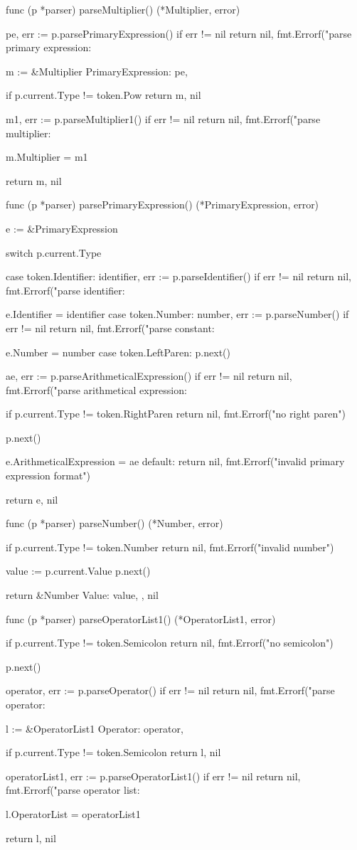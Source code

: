 func (p *parser) parseMultiplier() (*Multiplier, error) {
	pe, err := p.parsePrimaryExpression()
	if err != nil {
		return nil, fmt.Errorf("parse primary expression: %
	}

	m := &Multiplier{
		PrimaryExpression: pe,
	}

	if p.current.Type != token.Pow {
		return m, nil
	}

	m1, err := p.parseMultiplier1()
	if err != nil {
		return nil, fmt.Errorf("parse multiplier: %
	}

	m.Multiplier = m1

	return m, nil
}

func (p *parser) parsePrimaryExpression() (*PrimaryExpression, error) {
	e := &PrimaryExpression{}

	switch p.current.Type {
	case token.Identifier:
		identifier, err := p.parseIdentifier()
		if err != nil {
			return nil, fmt.Errorf("parse identifier: %
		}

		e.Identifier = identifier
	case token.Number:
		number, err := p.parseNumber()
		if err != nil {
			return nil, fmt.Errorf("parse constant: %
		}

		e.Number = number
	case token.LeftParen:
		p.next()

		ae, err := p.parseArithmeticalExpression()
		if err != nil {
			return nil, fmt.Errorf("parse arithmetical expression: %
		}

		if p.current.Type != token.RightParen {
			return nil, fmt.Errorf("no right paren")
		}

		p.next()

		e.ArithmeticalExpression = ae
	default:
		return nil, fmt.Errorf("invalid primary expression format")
	}

	return e, nil
}

func (p *parser) parseNumber() (*Number, error) {
	if p.current.Type != token.Number {
		return nil, fmt.Errorf("invalid number")
	}

	value := p.current.Value
	p.next()

	return &Number{
		Value: value,
	}, nil
}

func (p *parser) parseOperatorList1() (*OperatorList1, error) {
	if p.current.Type != token.Semicolon {
		return nil, fmt.Errorf("no semicolon")
	}

	p.next()

	operator, err := p.parseOperator()
	if err != nil {
		return nil, fmt.Errorf("parse operator: %
	}

	l := &OperatorList1{
		Operator: operator,
	}

	if p.current.Type != token.Semicolon {
		return l, nil
	}

	operatorList1, err := p.parseOperatorList1()
	if err != nil {
		return nil, fmt.Errorf("parse operator list: %
	}

	l.OperatorList = operatorList1

	return l, nil
}

